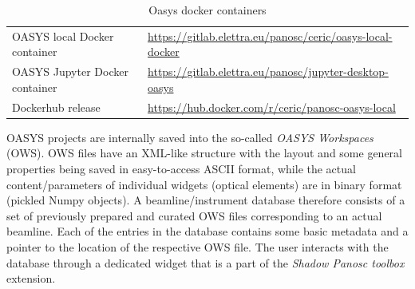 \documentclass[11pt, a4paper]{article}
\begin{document}
\begin{table}[ht]
  \label{tab:oasys_containers}
  \centering
  \begin{center}
    \caption{Oasys docker containers}
    \begin{tabular}{lp{10.6cm}}
      \hline
      OASYS local Docker container & \url{https://gitlab.elettra.eu/panosc/ceric/oasys-local-docker} \\
      OASYS Jupyter Docker container & \url{https://gitlab.elettra.eu/panosc/jupyter-desktop-oasys} \\
      Dockerhub release & \url{https://hub.docker.com/r/ceric/panosc-oasys-local}\\
      \hline
    \end{tabular}
  \end{center}
\end{table}
% 
OASYS projects are internally saved into the so-called \emph{OASYS Workspaces} (OWS). OWS files have an XML-like structure with the layout and some general properties being saved in easy-to-access ASCII format, while the actual content/parameters of individual widgets (optical elements) are in binary format (pickled Numpy objects). A beamline/instrument database therefore consists of a set of previously prepared and curated OWS files corresponding to an actual beamline. Each of the entries in the database contains some basic metadata and a pointer to the location of the respective OWS file. The user interacts with the database through a dedicated widget that is a part of the \emph{Shadow Panosc toolbox} extension.
\end{document}
